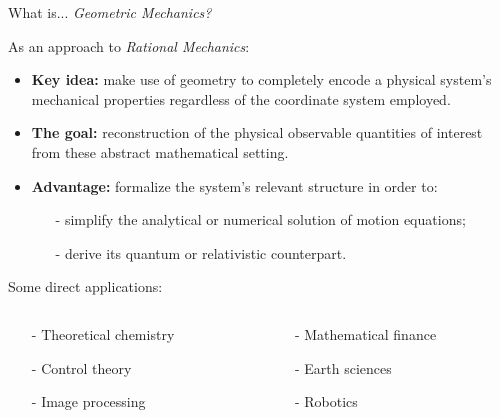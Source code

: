 \documentclass[handout,10pt]{beamer}
\begin{document}
\begin{frame}[t]{What is... \emph{Geometric Mechanics?}}
		\begin{block}{As an approach to \emph{Rational Mechanics}:}
			\begin{itemize}
				\item \textbf{Key idea:} make use of geometry to completely encode a physical system's mechanical properties regardless of the coordinate system employed.
				\item \textbf{The goal:} reconstruction of the physical observable quantities of interest from these abstract mathematical setting.
				\item \textbf{Advantage:} formalize the system's relevant structure in order to:
					\begin{itemize}
						\item[-] simplify the analytical or numerical solution of motion equations;
						\item[-] derive its quantum or relativistic counterpart.		
					\end{itemize}									
			\end{itemize}
		\end{block}
		\vfill
		\pause
		\begin{block}{Some direct applications:}
			\vspace{-0.5em}
			\begin{columns}
		    	\begin{column}{.45\textwidth}
					\begin{itemize}
						\item[-] Theoretical chemistry
						\item[-] Control theory
						\item[-] Image processing
					\end{itemize}
				\end{column}
		    	\begin{column}{.45\textwidth}
					\begin{itemize}
						\item[-] Mathematical finance
						\item[-] Earth sciences
						\item[-] Robotics
					\end{itemize}
				\end{column}
			\end{columns}
		\end{block}

\end{frame}
\end{document}
